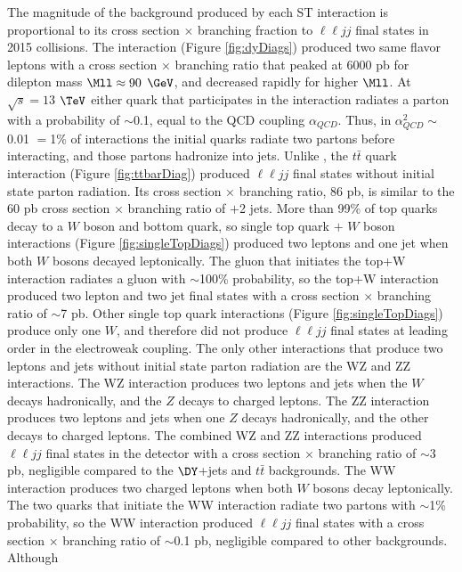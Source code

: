 The magnitude of the background produced by each ST interaction is proportional to its cross section $\times$ branching fraction 
to $\ell\ell jj$ final states in 2015 collisions.  The \DY interaction (Figure \ref{fig:dyDiags}) produced two same flavor 
leptons with a cross section $\times$ branching ratio that peaked at 6000 pb for dilepton mass $\Mll \approx 90$ $\GeV$, 
and decreased rapidly for higher $\Mll$.  At $\sqrt{s} = 13$ $\TeV$ either quark that participates in the \DY interaction 
radiates a parton with a probability of $\sim$0.1, equal to the QCD coupling $\alpha_{QCD}$.  Thus, in $\alpha_{QCD}^{2} \sim$
0.01 $=$1\% of \DY interactions the initial quarks radiate two partons before interacting, and those partons hadronize into 
jets.  Unlike \DY, the $t\bar{t}$ quark interaction (Figure \ref{fig:ttbarDiag}) produced $\ell\ell jj$ final states without 
initial state parton radiation.  Its cross section $\times$ branching ratio, 86 pb, is similar to the 60 pb cross section $\times$ 
branching ratio of \DY$\plus$2 jets.  More than 99\% of top quarks decay to a $W$ boson and bottom quark, so single top quark 
$\plus$ $W$ boson interactions (Figure \ref{fig:singleTopDiags}) produced two leptons and one jet when both $W$ bosons decayed 
leptonically.  The gluon that initiates the top+W interaction radiates a gluon with $\sim$100\% probability, so the top+W interaction 
produced two lepton and two jet final states with a cross section $\times$ branching ratio of $\sim$7 pb.  Other single top quark 
interactions (Figure \ref{fig:singleTopDiags}) produce only one $W$, and therefore did not produce $\ell\ell jj$ final states 
at leading order in the electroweak coupling.  The only other interactions that produce two 
leptons and jets without initial state parton radiation are the WZ and ZZ interactions.  The WZ interaction produces two leptons and 
jets when the $W$ decays hadronically, and the $Z$ decays to charged leptons.  The ZZ interaction produces two leptons and jets 
when one $Z$ decays hadronically, and the other decays to charged leptons.  The combined WZ and ZZ interactions produced $\ell\ell jj$ 
final states in the detector with a cross section $\times$ branching ratio of $\sim$3 pb, negligible compared to the $\DY$+jets 
and $t\bar{t}$ backgrounds.  The WW interaction produces two charged leptons when both $W$ bosons decay leptonically.  The two 
quarks that initiate the WW interaction radiate two partons with $\sim$1\% probability, so the WW interaction produced $\ell\ell jj$ 
final states with a cross section $\times$ branching ratio of $\sim$0.1 pb, negligible compared to other backgrounds.  Although 
